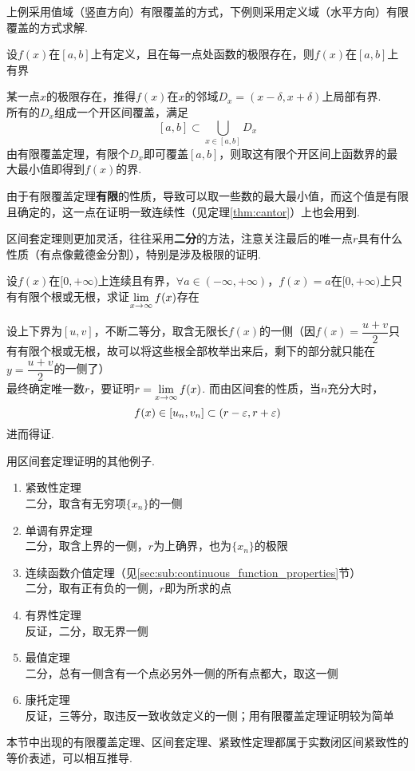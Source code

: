 \par 上例采用值域（竖直方向）有限覆盖的方式，下例则采用定义域（水平方向）有限覆盖的方式求解.
\begin{example}
设$f(x)$在$[a,b]$上有定义，且在每一点处函数的极限存在，则$f(x)$在$[a,b]$上有界
\end{example}
\begin{analysis}
某一点$x$的极限存在，推得$f(x)$在$x$的邻域$D_x=(x-\delta,x+\delta)$上局部有界.\\
所有的$D_x$组成一个开区间覆盖，满足
\[[a,b]\subset\bigcup_{x\in[a,b]}D_x\]
由有限覆盖定理，有限个$D_x$即可覆盖$[a,b]$，则取这有限个开区间上函数界的最大最小值即得到$f(x)$的界.
\end{analysis}
\par 由于有限覆盖定理\textbf{有限}的性质，导致可以取一些数的最大最小值，而这个值是有限且确定的，这一点在证明一致连续性（见定理\ref{thm:cantor}）上也会用到.
\par 区间套定理则更加灵活，往往采用\textbf{二分}的方法，注意关注最后的唯一点$r$具有什么性质（有点像戴德金分割），特别是涉及极限的证明.
\begin{example}
设$f(x)$在$[0,+\infty)$上连续且有界，$\forall a\in(-\infty,+\infty)$，$f(x)=a$在$[0,+\infty)$上只有有限个根或无根，求证$\displaystyle\lim_{x\to\infty}f(x)$存在
\end{example}
\begin{analysis}
设上下界为$[u,v]$，不断二等分，取含无限长$f(x)$的一侧（因$f(x)=\dfrac{u+v}{2}$只有有限个根或无根，故可以将这些根全部枚举出来后，剩下的部分就只能在$y=\dfrac{u+v}{2}$的一侧了）\\
最终确定唯一数$r$，要证明$r=\displaystyle\lim_{x\to\infty}f(x)$.
而由区间套的性质，当$n$充分大时，
\[f(x)\in[u_n,v_n]\subset(r-\varepsilon,r+\varepsilon)\]
进而得证.
\end{analysis}
\par 用区间套定理证明的其他例子.
\begin{example}
\begin{enumerate}
	\itemsep -2pt
	\item 紧致性定理\\
	二分，取含有无穷项$\{x_n\}$的一侧
	\item 单调有界定理\\
	二分，取含上界的一侧，$r$为上确界，也为$\{x_n\}$的极限
	\item 连续函数介值定理（见\ref{sec:sub:continuous_function_properties}节）\\
	二分，取有正有负的一侧，$r$即为所求的点
	\item 有界性定理\\
	反证，二分，取无界一侧
	\item 最值定理\\
	二分，总有一侧含有一个点必另外一侧的所有点都大，取这一侧
	\item 康托定理\\
	反证，三等分，取违反一致收敛定义的一侧；用有限覆盖定理证明较为简单
\end{enumerate}
\end{example}
\par 本节中出现的有限覆盖定理、区间套定理、紧致性定理都属于实数闭区间紧致性的等价表述，可以相互推导.

